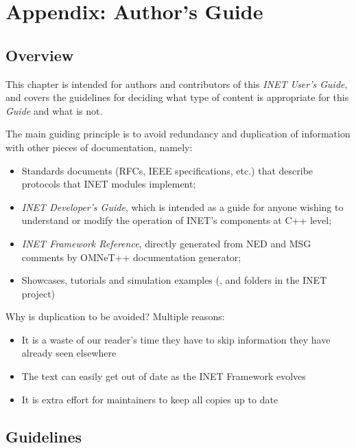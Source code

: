 \chapter{Appendix: Author's Guide}
\label{cha:authors-guide}


\section{Overview}
\label{sec:authorsguide:overview}

This chapter is intended for authors and contributors of this
\textit{INET User's Guide}, and covers the guidelines for deciding
what type of content is appropriate for this \textit{Guide} and
what is not.

The main guiding principle is to avoid redundancy and duplication
of information with other pieces of documentation, namely:

\begin{itemize}
  \item Standards documents (RFCs, IEEE specifications, etc.) that
    describe protocols that INET modules implement;
  \item \textit{INET Developer's Guide}, which is intended as a guide
    for anyone wishing to understand or modify the operation of
    INET's components at C++ level;
  \item \textit{INET Framework Reference}, directly generated from
    NED and MSG comments by OMNeT++ documentation generator;
  \item Showcases, tutorials and simulation examples (,
     and  folders in the INET project)
\end{itemize}

Why is duplication to be avoided? Multiple reasons:

\begin{itemize}
  \item It is a waste of our reader's time they have to skip information
     they have already seen elsewhere
  \item The text can easily get out of date as the INET Framework evolves
  \item It is extra effort for maintainers to keep all copies up to date
\end{itemize}


\section{Guidelines}
\label{sec:authorsguide:guidelines}

